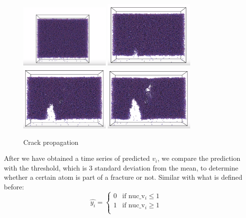 \begin{itemize}
\begin{itemize}
\begin{figure}
    \centering
    \noindent
\includegraphics[width=0.4\textwidth]{picture/frac_prop1.PNG}\hspace{0.2\textwidth}%
\includegraphics[width=0.4\textwidth]{picture/frac_prop2.PNG}\\[2em]
\includegraphics[width=0.4\textwidth]{picture/frac_prop3.PNG}\hspace{0.2\textwidth}%
\includegraphics[width=0.4\textwidth]{picture/frac_prop4.PNG}\par
    \caption{Crack propagation}
    \label{rnn}
\end{figure}







After we have obtained a time series of predicted $v_i$, we compare the prediction with the threshold, which is 3 standard deviation from the mean, to determine whether a certain atom is part of a fracture or not. Similar with what is defined before:
    \[
    \hat{y_i} = \begin{cases}
      0 & \text{if nuc_v$_i \le 1 $}\\
      1 & \text{if nuc_v$_i \ge 1 $}\\
    \end{cases} 
    \]  


\end{itemize}
\end{itemize}
